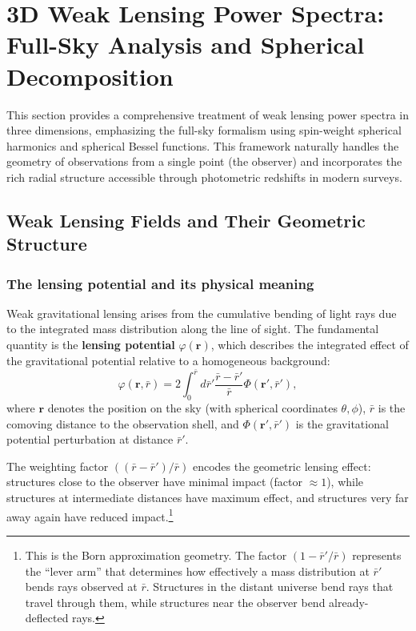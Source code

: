 \section{3D Weak Lensing Power Spectra: Full-Sky Analysis and Spherical Decomposition}

This section provides a comprehensive treatment of weak lensing power spectra in three dimensions, emphasizing the
full-sky formalism using spin-weight spherical harmonics and spherical Bessel functions. This framework naturally
handles the geometry of observations from a single point (the observer) and incorporates the rich radial structure
accessible through photometric redshifts in modern surveys.

\subsection{Weak Lensing Fields and Their Geometric Structure}

\subsubsection{The lensing potential and its physical meaning}

Weak gravitational lensing arises from the cumulative bending of light rays due to the integrated mass distribution
along the line of sight. The fundamental quantity is the \textbf{lensing potential} $\varphi(\mathbf{r})$, which describes
the integrated effect of the gravitational potential relative to a homogeneous background:
\begin{equation}
\varphi(\mathbf{r}, \bar{r}) = 2 \int_0^{\bar{r}} d\bar{r}' \frac{\bar{r} - \bar{r}'}{\bar{r}} \Phi(\mathbf{r}', \bar{r}'),
\label{eq:lensing_potential}
\end{equation}
where $\mathbf{r}$ denotes the position on the sky (with spherical coordinates $\theta, \phi$), $\bar{r}$ is the comoving distance
to the observation shell, and $\Phi(\mathbf{r}', \bar{r}')$ is the gravitational potential perturbation at distance $\bar{r}'$.

The weighting factor $((\bar{r}-\bar{r}')/\bar{r})$ encodes the geometric lensing effect: structures close to the observer
have minimal impact (factor $\approx 1$), while structures at intermediate distances have maximum effect, and structures very far away
again have reduced impact.\footnote{This is the Born approximation geometry. The factor $(1-\bar{r}'/\bar{r})$ represents
the ``lever arm'' that determines how effectively a mass distribution at $\bar{r}'$ bends rays observed at $\bar{r}$.
Structures in the distant universe bend rays that travel through them, while structures near the observer bend already-deflected rays.}

